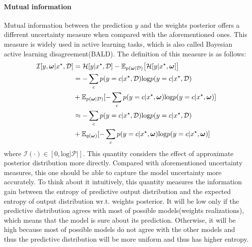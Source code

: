 \paragraph{Mutual information}
Mutual information between the prediction $y$ and the weights posterior offers a different uncertainty measure when compared with the aforementioned ones. This measure is widely used in active learning tasks\cite{houlsby2011bayesian}, which is also called Bayesian active learning disagreement(BALD). The definition of this measure is as follows:
\begin{equation}\label{mi}	
\begin{aligned}
\mathcal I[y,\boldsymbol \omega|x^\star, \mathcal D] &= \mathcal H[y|x^\star, \mathcal D] - \mathbb E_{p(\boldsymbol \omega| \mathcal D)}\big[\mathcal H[y|x^\star, \boldsymbol \omega] \big] \\
&= -\sum_{c}p(y=c|x^\star, \mathcal D)\text{log}p(y=c|x^\star, \mathcal D) \\ &+ \mathbb E_{p(\boldsymbol \omega|\mathcal D)}[-\sum_{c}p(y=c|x^\star, \boldsymbol \omega)\text{log}p(y=c|x^\star, \boldsymbol \omega)] \\
&\approx -\sum_{c}p(y=c|x^\star, \mathcal D)\text{log}p(y=c|x^\star, \mathcal D) \\ &+ \mathbb E_{q(\boldsymbol \omega)}[-\sum_{c}p(y=c|x^\star, \boldsymbol \omega)\text{log}p(y=c|x^\star, \boldsymbol \omega)]
\end{aligned}
\end{equation}
where $\mathcal I(\cdot) \in [0,\text{log}{|\mathcal P|}]$.
This quantity considers the effect of approximate posterior distribution more directly. Compared with aforementioned uncertainty measures, this one should be able to capture the model uncertainty more accurately. To think about it intuitively, this quantity measures the information gain between the entropy of predictive output distribution and the expected entropy of output distribution wr.t. weights posterior. It will be low only if the predictive distribution agrees with most of possible models(weights realizations), which means that the model is sure about its prediction. Otherwise, it will be high because most of possible models do not agree with the other models and thus the predictive distribution will be more uniform and thus has higher entropy.

